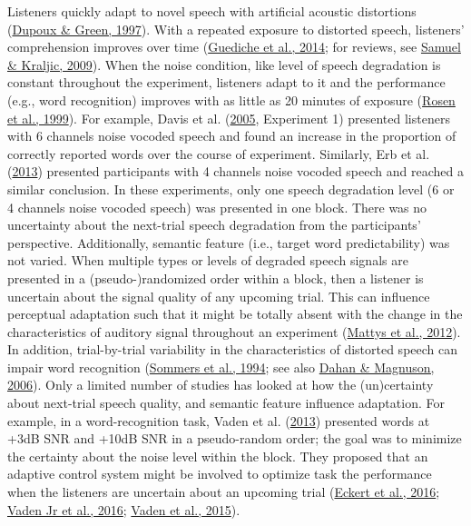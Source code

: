 \documentclass[a4paper, nobind]{templates/ociamthesis}
\begin{document}
Listeners quickly adapt to novel speech with artificial acoustic distortions (\protect\hyperlink{ref-Dupoux1997}{Dupoux \& Green, 1997}).
With a repeated exposure to distorted speech, listeners' comprehension improves over time (\protect\hyperlink{ref-Guediche2014}{Guediche et al., 2014}; for reviews, see \protect\hyperlink{ref-Samuel2009}{Samuel \& Kraljic, 2009}).
When the noise condition, like level of speech degradation is constant throughout the experiment, listeners adapt to it and the performance (e.g., word recognition) improves with as little as 20 minutes of exposure (\protect\hyperlink{ref-Rosen1999}{Rosen et al., 1999}).
For example, Davis et al. (\protect\hyperlink{ref-Davis2005}{2005}, Experiment 1) presented listeners with 6 channels noise vocoded speech and found an increase in the proportion of correctly reported words over the course of experiment.
Similarly, Erb et al. (\protect\hyperlink{ref-Erb2013}{2013}) presented participants with 4 channels noise vocoded speech and reached a similar conclusion.
In these experiments, only one speech degradation level (6 or 4 channels noise vocoded speech) was presented in one block.
There was no uncertainty about the next-trial speech degradation from the participants' perspective.
Additionally, semantic feature (i.e., target word predictability) was not varied.
When multiple types or levels of degraded speech signals are presented in a (pseudo-)randomized order within a block, then a listener is uncertain about the signal quality of any upcoming trial.
This can influence perceptual adaptation such that
it might be totally absent with the change in the characteristics of auditory signal throughout an experiment (\protect\hyperlink{ref-Mattys2012}{Mattys et al., 2012}).
In addition, trial-by-trial variability in the characteristics of distorted speech can impair word recognition (\protect\hyperlink{ref-Sommers1994}{Sommers et al., 1994}; see also \protect\hyperlink{ref-Dahan2006}{Dahan \& Magnuson, 2006}).
Only a limited number of studies has looked at how the (un)certainty about next-trial speech quality, and semantic feature influence adaptation.
For example, in a word-recognition task, Vaden et al. (\protect\hyperlink{ref-Vaden2013}{2013}) presented words at +3dB SNR and +10dB SNR in a pseudo-random order;
the goal was to minimize the certainty about the noise level within the block.
They proposed that an adaptive control system might be involved to optimize task the performance when the listeners are uncertain about an upcoming trial (\protect\hyperlink{ref-Eckert2016}{Eckert et al., 2016}; \protect\hyperlink{ref-Vaden2016}{Vaden Jr et al., 2016}; \protect\hyperlink{ref-Vaden2015}{Vaden et al., 2015}).
\end{document}
